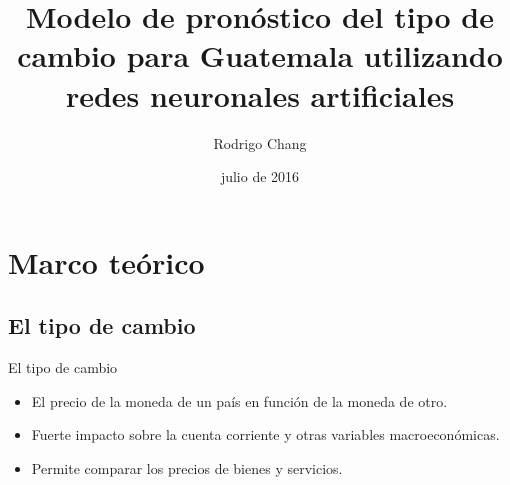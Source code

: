 \documentclass{beamer}
\title[Laboratorio de microcontroladores]{Modelo de pronóstico del tipo de cambio para Guatemala utilizando redes neuronales artificiales}
\author{Rodrigo Chang}
\institute[USAC]
{
Banco de Guatemala \\ 
\medskip
\textit{Programa de Estudios Superiores} %
}
\date{julio de 2016} %
\begin{document}
\begin{frame}
\titlepage 
\end{frame}

\begin{comment}
\begin{frame}
\frametitle{Lo que veremos hoy...} 
\tableofcontents
\end{frame}
\end{comment}

\section{Marco teórico}

\subsection{El tipo de cambio}

\begin{frame}{El tipo de cambio}
	\begin{itemize}
		\item El precio de la moneda de un país en función de la moneda de otro.
		\item Fuerte impacto sobre la cuenta corriente y otras variables macroeconómicas.
		\item Permite comparar los precios de bienes y servicios.
	\end{itemize}
\end{frame}

\begin{comment}
\begin{frame}{El mercado de divisas}
	Tres sectores de comercio:
	\begin{itemize}
		\item El comercio interbancario, que conforma entre un 60\% a 80\% del mercado \parencite{exchecon}.
		
		\item El comercio manejado a través de corredores de instituciones financieras no bancarias, que conforma de un 15\% a un 35\%.
		
		\item Y el comercio manejado por clientes privados y empresas multinacionales, que conforma alrededor del 5\%.
	\end{itemize}
	
	Además: 
	
	\begin{itemize}
		\item Intervención de bancos centrales en el mercado 
	\end{itemize}
\end{frame}
\end{comment}
\end{document}
